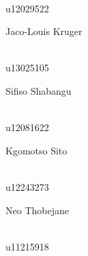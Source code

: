 \documentclass[a4paper,12pt]{report}
\begin{document}
\begin{titlepage}
\begin{center}
\begin{minipage}{0.4\textwidth}
\end{minipage}
\begin{minipage}{0.4\textwidth}
\begin{flushright} \large
\emph{} \\
u12029522
\end{flushright}
\end{minipage}
\begin{minipage}{0.4\textwidth}
\begin{flushleft} \large
Jaco-Louis {Kruger}
\end{flushleft}
\end{minipage}
\begin{minipage}{0.4\textwidth}
\begin{flushright} \large
\emph{} \\
u13025105
\end{flushright}
\end{minipage}
\begin{minipage}{0.4\textwidth}
\begin{flushleft} \large
Sifiso {Shabangu}
\end{flushleft}
\end{minipage}
\begin{minipage}{0.4\textwidth}
\begin{flushright} \large
\emph{} \\
u12081622
\end{flushright}
\end{minipage}
\begin{minipage}{0.4\textwidth}
\begin{flushleft} \large
Kgomotso {Sito}
\end{flushleft}
\end{minipage}
\begin{minipage}{0.4\textwidth}
\begin{flushright} \large
\emph{} \\
u12243273
\end{flushright}
\end{minipage}
\begin{minipage}{0.4\textwidth}
\begin{flushleft} \large
Neo {Thobejane}
\end{flushleft}
\end{minipage}
\begin{minipage}{0.4\textwidth}
\begin{flushright} \large
\emph{} \\
u11215918
\end{flushright}

\end{minipage}
\end{center}
\end{titlepage}
\end{document}
